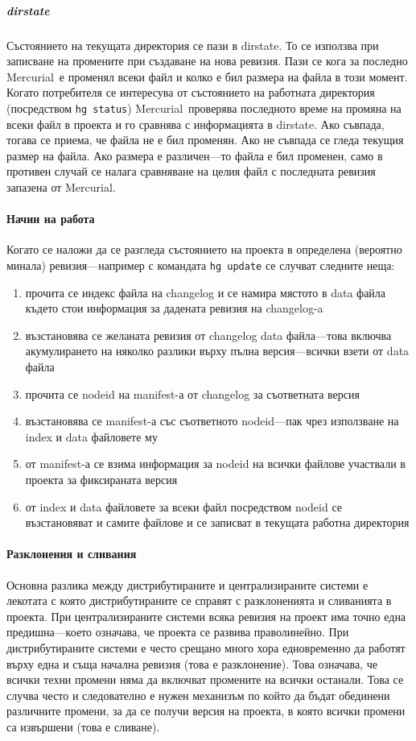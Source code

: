 \documentclass[a4paper]{article}
\def\Hg{Mercurial}
\begin{document}
    \subparagraph{dirstate}
    Състоянието на текущата директория се пази в dirstate. То се използва при
    записване на промените при създаване на нова ревизия. Пази се кога за
    последно \Hg\ е променял всеки файл и колко е бил размера на файла в този
    момент. Когато потребителя се интересува от състоянието на работната
    директория (посредством \texttt{hg status}) \Hg\ проверява последното време
    на промяна на всеки файл в проекта и го сравнява с информацията в dirstate.
    Ако съвпада, тогава се приема, че файла не е бил променян. Ако не съвпада
    се гледа текущия размер на файла. Ако размера е различен---то файла е бил
    променен, само в противен случай се налага сравняване на целия файл
    с последната ревизия запазена от \Hg.

    \paragraph{Начин на работа}
    Когато се наложи да се разгледа състоянието на проекта в определена
    (вероятно минала) ревизия---например с командата \texttt{hg update} се
    случват следните неща:
    \begin{enumerate}
      \item прочита се индекс файла на changelog и се намира мястото в data
      файла където стои информация за дадената ревизия на changelog-a
      \item възстановява се желаната ревизия от changelog data файла---това
      включва акумулирането на няколко разлики върху пълна версия---всички взети
      от data файла
      \item прочита се nodeid на manifest-а от changelog за съответната версия
      \item възстановява се manifest-а със съответното nodeid---пак чрез
      използване на index и data файловете му
      \item от manifest-а се взима информация за nodeid на всички файлове
      участвали в проекта за фиксираната версия
      \item от index и data файловете за всеки файл посредством nodeid се
      възстановяват и самите файлове и се записват в текущата работна
      директория
    \end{enumerate}

    \paragraph{Разклонения и сливания}
    Основна разлика между дистрибутираните и централизираните системи
    е лекотата с която дистрибутираните се справят с разклоненията и сливанията
    в проекта. При централизираните системи всяка ревизия на проект има точно
    една предишна---което означава, че проекта се развива праволинейно. При
    дистрибутираните системи е често срещано много хора едновременно да работят
    върху една и съща начална ревизия (това е разклонение). Това означава, че
    всички техни промени няма да включват промените на всички останали. Това се
    случва често и следователно е нужен механизъм по който да бъдат обединени
    различните промени, за да се получи версия на проекта, в която всички
    промени са извършени (това е сливане).
\end{document}
